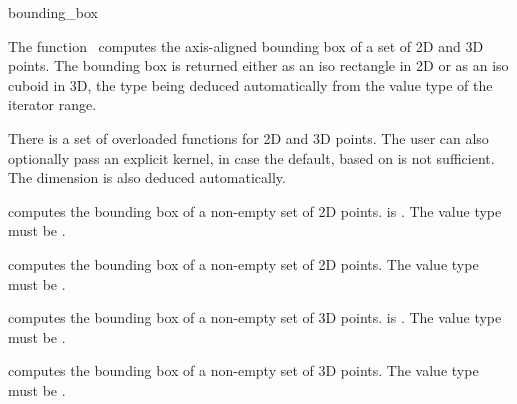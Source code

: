 
\begin{ccRefFunction}{bounding_box}  

\ccDefinition
  
The function \ccRefName\ computes the axis-aligned bounding box of a set of 2D and 3D points. The bounding box is returned either as an iso rectangle in 2D or as an iso cuboid in 3D, the type being deduced automatically from the value type of the iterator range.


There is a set of overloaded  functions for 2D and 3D points. The user can also optionally pass an explicit kernel, in case the default, based on  is not sufficient. The dimension is also deduced automatically.

{ computes the bounding box of a non-empty set of 2D points.
   is .  The value type must be .
 }

{ computes the bounding box of a non-empty set of 2D points.
  The value type must be .
 }

{ computes the bounding box of a non-empty set of 3D points.
   is .
  The value type must be .
 }

{ computes the bounding box of a non-empty set of 3D points.
  The value type must be .
 }

\end{ccRefFunction}
